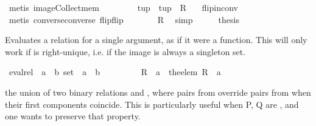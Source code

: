 \begin{isabellebody}
\ {\isacharparenleft}metis\ image{\isacharunderscore}Collect{\isacharunderscore}mem{\isacharparenright}\isanewline
\ \ \isamarkupfalse%
\ \isamarkupfalse%
\ {\isachardoublequoteopen}{\isasymdots}\ {\isacharequal}\ {\isacharbraceleft}\ tup\ {\isachardot}\ tup\ {\isasymin}\ R{\isasyminverse}\ {\isacharbraceright}{\isachardoublequoteclose}\ \isamarkupfalse%
\ flip{\isacharunderscore}in{\isacharunderscore}conv\ \isamarkupfalse%
\ {\isacharparenleft}metis\ converse{\isacharunderscore}converse\ flip{\isacharunderscore}flip{\isacharparenright}\isanewline
\ \ \isamarkupfalse%
\ \isamarkupfalse%
\ {\isachardoublequoteopen}{\isasymdots}\ {\isacharequal}\ R{\isasyminverse}{\isachardoublequoteclose}\ \isamarkupfalse%
\ simp\isanewline
\ \ \isamarkupfalse%
\ \isamarkupfalse%
\ {\isacharquery}thesis\ \isacommand{{\isachardot}}\isamarkupfalse%
\isanewline
{}\isamarkupfalse%
%
\endisatagproof
{\isafoldproof}%
%
\isadelimproof
%
\endisadelimproof
%
\isamarkuptrue%
%
\begin{isamarkuptext}%
Evaluates a relation  for a single argument, as if it were a function.
  This will only work if  is right-unique, i.e. if the image is always a singleton set.%
\end{isamarkuptext}%
\isamarkuptrue%
\isamarkupfalse%
\ eval{\isacharunderscore}rel\ {\isacharcolon}{\isacharcolon}\ {\isachardoublequoteopen}{\isacharparenleft}{\isacharprime}a\ {\isasymtimes}\ {\isacharprime}b{\isacharparenright}\ set\ {\isasymRightarrow}\ {\isacharprime}a\ {\isasymRightarrow}\ {\isacharprime}b{\isachardoublequoteclose}\ {\isacharparenleft}\ {\isachardoublequoteopen}{\isacharcomma}{\isacharcomma}{\isachardoublequoteclose}\ {}{}{\isacharparenright}\ \isanewline
\ \ \ \ \ {\isachardoublequoteopen}R\ {\isacharcomma}{\isacharcomma}\ a\ {\isacharequal}\ the{\isacharunderscore}elem\ {\isacharparenleft}R\ {\isacharbackquote}{\isacharbackquote}\ {\isacharbraceleft}a{\isacharbraceright}{\isacharparenright}{\isachardoublequoteclose}%
\isamarkuptrue%
%
\begin{isamarkuptext}%
the union of two binary relations  and , where pairs from 
  override pairs from  when their first components coincide.
This is particularly useful when P, Q are , and one wants to preserve that property.%

\end{isamarkuptext}
\end{isabellebody}
